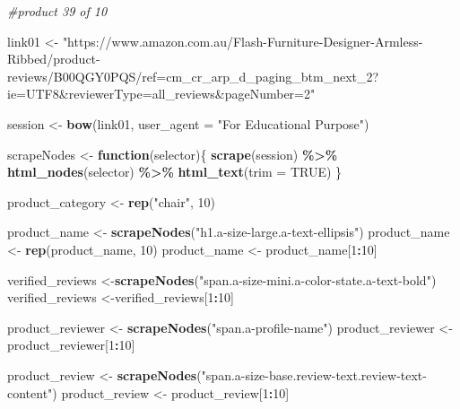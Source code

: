 \documentclass[
]{article}
\newenvironment{Shaded}{\begin{snugshade}}{\end{snugshade}}
\newcommand{\AttributeTok}[1]{\textcolor[rgb]{0.13,0.29,0.53}{#1}}
\newcommand{\CommentTok}[1]{\textcolor[rgb]{0.56,0.35,0.01}{\textit{#1}}}
\newcommand{\ConstantTok}[1]{\textcolor[rgb]{0.56,0.35,0.01}{#1}}
\newcommand{\ControlFlowTok}[1]{\textcolor[rgb]{0.13,0.29,0.53}{\textbf{#1}}}
\newcommand{\DecValTok}[1]{\textcolor[rgb]{0.00,0.00,0.81}{#1}}
\newcommand{\FunctionTok}[1]{\textcolor[rgb]{0.13,0.29,0.53}{\textbf{#1}}}
\newcommand{\NormalTok}[1]{#1}
\newcommand{\OtherTok}[1]{\textcolor[rgb]{0.56,0.35,0.01}{#1}}
\newcommand{\SpecialCharTok}[1]{\textcolor[rgb]{0.81,0.36,0.00}{\textbf{#1}}}
\newcommand{\StringTok}[1]{\textcolor[rgb]{0.31,0.60,0.02}{#1}}
\begin{document}
\begin{Shaded}
\begin{Highlighting}[]
\CommentTok{\#product 39 of 10}

\NormalTok{link01 }\OtherTok{\textless{}{-}} \StringTok{"https://www.amazon.com.au/Flash{-}Furniture{-}Designer{-}Armless{-}Ribbed/product{-}reviews/B00QGY0PQS/ref=cm\_cr\_arp\_d\_paging\_btm\_next\_2?ie=UTF8\&reviewerType=all\_reviews\&pageNumber=2"}


\NormalTok{  session }\OtherTok{\textless{}{-}} \FunctionTok{bow}\NormalTok{(link01,}
               \AttributeTok{user\_agent =} \StringTok{"For Educational Purpose"}\NormalTok{)}

\NormalTok{  scrapeNodes }\OtherTok{\textless{}{-}} \ControlFlowTok{function}\NormalTok{(selector)\{}
    \FunctionTok{scrape}\NormalTok{(session) }\SpecialCharTok{\%\textgreater{}\%}
      \FunctionTok{html\_nodes}\NormalTok{(selector) }\SpecialCharTok{\%\textgreater{}\%}
      \FunctionTok{html\_text}\NormalTok{(}\AttributeTok{trim =} \ConstantTok{TRUE}\NormalTok{)}
\NormalTok{  \}}

\NormalTok{  product\_category }\OtherTok{\textless{}{-}} \FunctionTok{rep}\NormalTok{(}\StringTok{"chair"}\NormalTok{, }\DecValTok{10}\NormalTok{)}

\NormalTok{  product\_name }\OtherTok{\textless{}{-}} \FunctionTok{scrapeNodes}\NormalTok{(}\StringTok{"h1.a{-}size{-}large.a{-}text{-}ellipsis"}\NormalTok{)}
\NormalTok{  product\_name }\OtherTok{\textless{}{-}} \FunctionTok{rep}\NormalTok{(product\_name, }\DecValTok{10}\NormalTok{)}
\NormalTok{  product\_name }\OtherTok{\textless{}{-}}\NormalTok{ product\_name[}\DecValTok{1}\SpecialCharTok{:}\DecValTok{10}\NormalTok{]}
  
\NormalTok{  verified\_reviews }\OtherTok{\textless{}{-}}\FunctionTok{scrapeNodes}\NormalTok{(}\StringTok{"span.a{-}size{-}mini.a{-}color{-}state.a{-}text{-}bold"}\NormalTok{)}
\NormalTok{  verified\_reviews }\OtherTok{\textless{}{-}}\NormalTok{verified\_reviews[}\DecValTok{1}\SpecialCharTok{:}\DecValTok{10}\NormalTok{]}
  
\NormalTok{  product\_reviewer }\OtherTok{\textless{}{-}} \FunctionTok{scrapeNodes}\NormalTok{(}\StringTok{"span.a{-}profile{-}name"}\NormalTok{)}
\NormalTok{  product\_reviewer }\OtherTok{\textless{}{-}}\NormalTok{ product\_reviewer[}\DecValTok{1}\SpecialCharTok{:}\DecValTok{10}\NormalTok{]}
  
\NormalTok{  product\_review }\OtherTok{\textless{}{-}} \FunctionTok{scrapeNodes}\NormalTok{(}\StringTok{"span.a{-}size{-}base.review{-}text.review{-}text{-}content"}\NormalTok{)}
\NormalTok{  product\_review }\OtherTok{\textless{}{-}}\NormalTok{ product\_review[}\DecValTok{1}\SpecialCharTok{:}\DecValTok{10}\NormalTok{]}
  

\end{Highlighting}
\end{Shaded}
\end{document}
